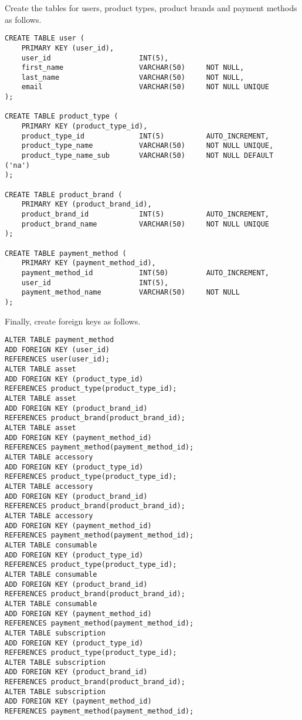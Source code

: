 Create the tables for users, product types, product brands and payment methods as follows.
\begin{lstlisting}
CREATE TABLE user (
    PRIMARY KEY (user_id),
    user_id                     INT(5),
    first_name                  VARCHAR(50)     NOT NULL,
    last_name                   VARCHAR(50)     NOT NULL,
    email                       VARCHAR(50)     NOT NULL UNIQUE
);

CREATE TABLE product_type (
    PRIMARY KEY (product_type_id),
    product_type_id             INT(5)          AUTO_INCREMENT,
    product_type_name           VARCHAR(50)     NOT NULL UNIQUE,
    product_type_name_sub       VARCHAR(50)     NOT NULL DEFAULT ('na')
);

CREATE TABLE product_brand (
    PRIMARY KEY (product_brand_id),
    product_brand_id            INT(5)          AUTO_INCREMENT,
    product_brand_name          VARCHAR(50)     NOT NULL UNIQUE
);

CREATE TABLE payment_method (
    PRIMARY KEY (payment_method_id),
    payment_method_id           INT(50)         AUTO_INCREMENT,
    user_id                     INT(5),
    payment_method_name         VARCHAR(50)     NOT NULL
);
\end{lstlisting}

Finally, create foreign keys as follows.
\begin{lstlisting}
ALTER TABLE payment_method
ADD FOREIGN KEY (user_id)
REFERENCES user(user_id);
ALTER TABLE asset
ADD FOREIGN KEY (product_type_id)
REFERENCES product_type(product_type_id);
ALTER TABLE asset
ADD FOREIGN KEY (product_brand_id)
REFERENCES product_brand(product_brand_id);
ALTER TABLE asset
ADD FOREIGN KEY (payment_method_id)
REFERENCES payment_method(payment_method_id);
ALTER TABLE accessory
ADD FOREIGN KEY (product_type_id)
REFERENCES product_type(product_type_id);
ALTER TABLE accessory
ADD FOREIGN KEY (product_brand_id)
REFERENCES product_brand(product_brand_id);
ALTER TABLE accessory
ADD FOREIGN KEY (payment_method_id)
REFERENCES payment_method(payment_method_id);
ALTER TABLE consumable
ADD FOREIGN KEY (product_type_id)
REFERENCES product_type(product_type_id);
ALTER TABLE consumable
ADD FOREIGN KEY (product_brand_id)
REFERENCES product_brand(product_brand_id);
ALTER TABLE consumable
ADD FOREIGN KEY (payment_method_id)
REFERENCES payment_method(payment_method_id);
ALTER TABLE subscription
ADD FOREIGN KEY (product_type_id)
REFERENCES product_type(product_type_id);
ALTER TABLE subscription
ADD FOREIGN KEY (product_brand_id)
REFERENCES product_brand(product_brand_id);
ALTER TABLE subscription
ADD FOREIGN KEY (payment_method_id)
REFERENCES payment_method(payment_method_id);
\end{lstlisting}

